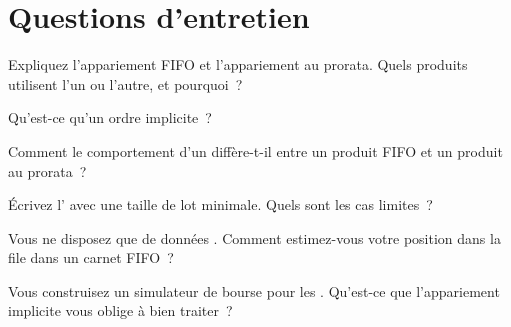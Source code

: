 \section{Questions d'entretien}

\begin{interviewq}\label{iq:m1:matching-algorithms-and-implied-spreads:1}
Expliquez l'appariement FIFO et l'appariement au prorata. Quels produits utilisent l'un ou l'autre, et pourquoi~?
\end{interviewq}

\begin{interviewq}\label{iq:m1:matching-algorithms-and-implied-spreads:2}
Qu'est-ce qu'un ordre implicite~?
\end{interviewq}

\begin{interviewq}\label{iq:m1:matching-algorithms-and-implied-spreads:3}
Comment le comportement d'un  diffère-t-il entre un produit FIFO et un
produit au prorata~?
\end{interviewq}

\begin{interviewq}\label{iq:m1:matching-algorithms-and-implied-spreads:4}
Écrivez l' avec une taille de lot minimale. Quels sont les cas limites~?
\end{interviewq}

\begin{interviewq}\label{iq:m1:matching-algorithms-and-implied-spreads:5}
Vous ne disposez que de données . Comment estimez-vous votre position dans la file
dans un carnet FIFO~?
\end{interviewq}

\begin{interviewq}\label{iq:m1:matching-algorithms-and-implied-spreads:6}
Vous construisez un simulateur de bourse pour les . Qu'est-ce que
l'appariement implicite vous oblige à bien traiter~?
\end{interviewq}
